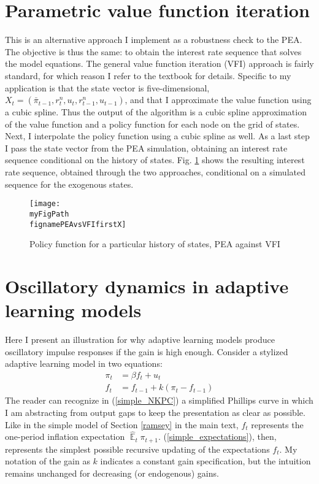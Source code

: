 \documentclass[11pt]{article}
\def \myFigPath {../../figures/}
\renewcommand{\[}{\begin{equation}}
\renewcommand{\]}{\end{equation}}
\DeclareMathOperator{\E}{\mathbb{E}}
\def\fignamePEAvsVFIfirstX{compare_value_pea_results_approx_value_outputs_approx17_Sep_2020_14_01_16_pea_outputs_approx17_Sep_2020_13_47_33_pretty_19_Sep_2020_09_30_01}
\begin{document}
\section{Parametric value function iteration} \label{vfi}
This is an alternative approach I implement as a robustness check to the PEA. The objective is thus the same: to obtain the interest rate sequence that solves the model equations. The general value function iteration (VFI) approach is fairly standard, for which reason I refer to the \cite{judd1998numerical} textbook for details. Specific to my application is that the state vector is five-dimensional, $X_t = (\bar{\pi}_{t-1}, r^n_t, u_t, r^n_{t-1}, u_{t-1})$, and that I approximate the value function using a cubic spline. Thus the output of the algorithm is a cubic spline approximation of the value function and a policy function for each node on the grid of states. Next, I interpolate the policy function using a cubic spline as well. As a last step I pass the state vector from the PEA simulation, obtaining an interest rate sequence conditional on the history of states. Fig. \ref{compare_pea_vfi} shows the resulting interest rate sequence, obtained through the two approaches, conditional on a  simulated sequence for the exogenous states.

\begin{figure}[h!]
\texttt{[image: \\myFigPath \\fignamePEAvsVFIfirstX]}
\caption{Policy function for a particular history of states, PEA against VFI}
\label{compare_pea_vfi}
\end{figure}


\section{Oscillatory dynamics in adaptive learning models} \label{app_oscillations}
Here I present an illustration for why adaptive learning models produce oscillatory impulse responses if the gain is high enough. Consider a stylized adaptive learning model in two equations:
\begin{align}
\pi_t & = \beta f_t + u_t \label{simple_NKPC} \\
f_t & = f_{t-1} + k(\pi_t - f_{t-1}) \label{simple_expectations}
\end{align}
The reader can recognize in (\ref{simple_NKPC}) a simplified Phillips curve in which I am abstracting from output gaps to keep the presentation as clear as possible. Like in the simple model of Section \ref{ramsey} in the main text, $f_t$ represents the one-period inflation expectation $\hat{\E}_t \pi_{t+1}$. (\ref{simple_expectations}), then, represents the simplest possible recursive updating of the expectations $f_t$. My notation of the gain as $k$ indicates a constant gain specification, but the intuition remains unchanged for decreasing (or endogenous) gains. 
\end{document}
